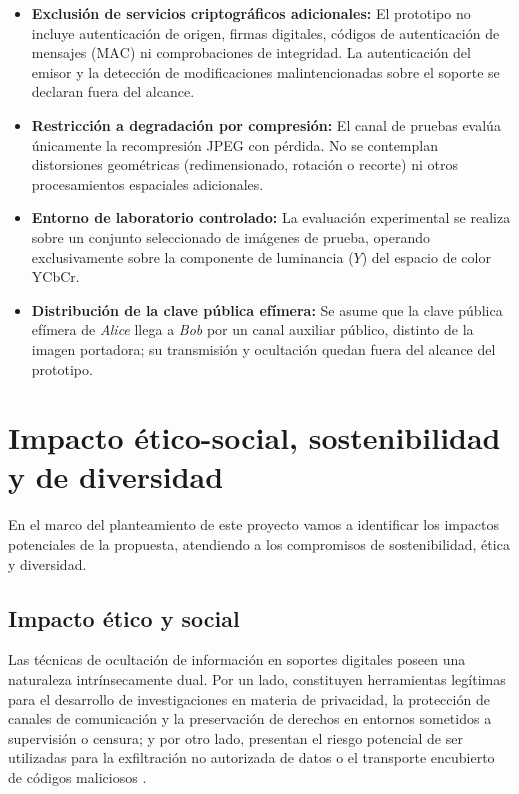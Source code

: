 \documentclass[IB]{TFUOC}%
\begin{document}
\begin{itemize}
    \item \textbf{Exclusión de servicios criptográficos adicionales:} El prototipo no incluye autenticación de origen, firmas digitales, códigos de autenticación de mensajes ($\mathrm{MAC}$) ni comprobaciones de integridad. La autenticación del emisor y la detección de modificaciones malintencionadas sobre el soporte se declaran fuera del alcance.
    \item \textbf{Restricción a degradación por compresión:} El canal de pruebas evalúa únicamente la recompresión JPEG con pérdida. No se contemplan distorsiones geométricas (redimensionado, rotación o recorte) ni otros procesamientos espaciales adicionales.
    \item \textbf{Entorno de laboratorio controlado:} La evaluación experimental se realiza sobre un conjunto seleccionado de imágenes de prueba, operando exclusivamente sobre la componente de luminancia ($Y$) del espacio de color YCbCr.
    \item \textbf{Distribución de la clave pública efímera:} Se asume que la clave pública efímera de \textit{Alice} llega a \textit{Bob} por un canal auxiliar público, distinto de la imagen portadora; su transmisión y ocultación quedan fuera del alcance del prototipo.
\end{itemize}

\section{Impacto ético-social, sostenibilidad y de diversidad}
\label{sec:impacto_etico_social}


En el marco del planteamiento de este proyecto vamos a identificar los impactos potenciales de la propuesta, atendiendo a los compromisos de sostenibilidad, ética y diversidad.

\subsection{Impacto ético y social}
\label{subsec:impacto_etico_social}

Las técnicas de ocultación de información en soportes digitales poseen una naturaleza intrínsecamente dual. Por un lado, constituyen herramientas legítimas para el desarrollo de investigaciones en materia de privacidad, la protección de canales de comunicación y la preservación de derechos en entornos sometidos a supervisión o censura; y por otro lado, presentan el riesgo potencial de ser utilizadas para la exfiltración no autorizada de datos o el transporte encubierto de códigos maliciosos \cite{21}.
\end{document}
